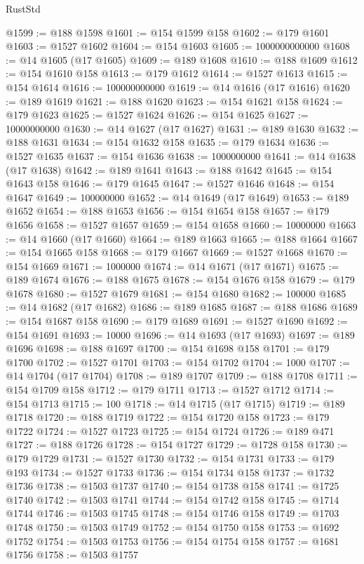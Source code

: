 \begin{lexlean}{RustStd}
\begin{coremodule}
{\begin{coremodule}
{{{{{{{{{{{{{{{{{{{{{{{{{{{{{{{{{{{{{{{@1599 := @188 @1598
@1601 := @154 @1599 @158
@1602 := @179 @1601
@1603 := @1527 @1602
@1604 := @154 @1603
@1605 := 1000000000000
@1608 := @14 @1605 (@17 @1605)
@1609 := @189 @1608
@1610 := @188 @1609
@1612 := @154 @1610 @158
@1613 := @179 @1612
@1614 := @1527 @1613
@1615 := @154 @1614
@1616 := 100000000000
@1619 := @14 @1616 (@17 @1616)
@1620 := @189 @1619
@1621 := @188 @1620
@1623 := @154 @1621 @158
@1624 := @179 @1623
@1625 := @1527 @1624
@1626 := @154 @1625
@1627 := 10000000000
@1630 := @14 @1627 (@17 @1627)
@1631 := @189 @1630
@1632 := @188 @1631
@1634 := @154 @1632 @158
@1635 := @179 @1634
@1636 := @1527 @1635
@1637 := @154 @1636
@1638 := 1000000000
@1641 := @14 @1638 (@17 @1638)
@1642 := @189 @1641
@1643 := @188 @1642
@1645 := @154 @1643 @158
@1646 := @179 @1645
@1647 := @1527 @1646
@1648 := @154 @1647
@1649 := 100000000
@1652 := @14 @1649 (@17 @1649)
@1653 := @189 @1652
@1654 := @188 @1653
@1656 := @154 @1654 @158
@1657 := @179 @1656
@1658 := @1527 @1657
@1659 := @154 @1658
@1660 := 10000000
@1663 := @14 @1660 (@17 @1660)
@1664 := @189 @1663
@1665 := @188 @1664
@1667 := @154 @1665 @158
@1668 := @179 @1667
@1669 := @1527 @1668
@1670 := @154 @1669
@1671 := 1000000
@1674 := @14 @1671 (@17 @1671)
@1675 := @189 @1674
@1676 := @188 @1675
@1678 := @154 @1676 @158
@1679 := @179 @1678
@1680 := @1527 @1679
@1681 := @154 @1680
@1682 := 100000
@1685 := @14 @1682 (@17 @1682)
@1686 := @189 @1685
@1687 := @188 @1686
@1689 := @154 @1687 @158
@1690 := @179 @1689
@1691 := @1527 @1690
@1692 := @154 @1691
@1693 := 10000
@1696 := @14 @1693 (@17 @1693)
@1697 := @189 @1696
@1698 := @188 @1697
@1700 := @154 @1698 @158
@1701 := @179 @1700
@1702 := @1527 @1701
@1703 := @154 @1702
@1704 := 1000
@1707 := @14 @1704 (@17 @1704)
@1708 := @189 @1707
@1709 := @188 @1708
@1711 := @154 @1709 @158
@1712 := @179 @1711
@1713 := @1527 @1712
@1714 := @154 @1713
@1715 := 100
@1718 := @14 @1715 (@17 @1715)
@1719 := @189 @1718
@1720 := @188 @1719
@1722 := @154 @1720 @158
@1723 := @179 @1722
@1724 := @1527 @1723
@1725 := @154 @1724
@1726 := @189 @471
@1727 := @188 @1726
@1728 := @154 @1727
@1729 := @1728 @158
@1730 := @179 @1729
@1731 := @1527 @1730
@1732 := @154 @1731
@1733 := @179 @193
@1734 := @1527 @1733
@1736 := @154 @1734 @158
@1737 := @1732 @1736
@1738 := @1503 @1737
@1740 := @154 @1738 @158
@1741 := @1725 @1740
@1742 := @1503 @1741
@1744 := @154 @1742 @158
@1745 := @1714 @1744
@1746 := @1503 @1745
@1748 := @154 @1746 @158
@1749 := @1703 @1748
@1750 := @1503 @1749
@1752 := @154 @1750 @158
@1753 := @1692 @1752
@1754 := @1503 @1753
@1756 := @154 @1754 @158
@1757 := @1681 @1756
@1758 := @1503 @1757
}}}}}}}}}}}}}}}}}}}}}}}}}}}}}}}}}}}}}}}
\end{coremodule}}
\end{coremodule}
\end{lexlean}
